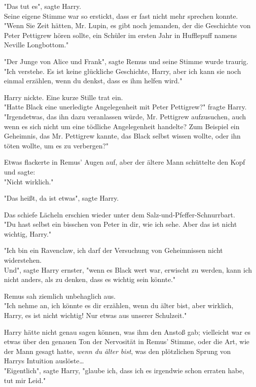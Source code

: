 {"Das tut es", sagte Harry.\\ Seine eigene Stimme war so erstickt, dass er fast nicht mehr sprechen konnte.\\ "Wenn Sie Zeit hätten, Mr. Lupin, es gibt noch jemanden, der die Geschichte von Peter Pettigrew hören sollte, ein Schüler im ersten Jahr in Hufflepuff namens Neville Longbottom."

"Der Junge von Alice und Frank", sagte Remus und seine Stimme wurde traurig.\\ "Ich verstehe. Es ist keine glückliche Geschichte, Harry, aber ich kann sie noch einmal erzählen, wenn du denkst, dass es ihm helfen wird."

Harry nickte. Eine kurze Stille trat ein.\\ "Hatte Black eine unerledigte Angelegenheit mit Peter Pettigrew?" fragte Harry.\\ "Irgendetwas, das ihn dazu veranlassen würde, Mr. Pettigrew aufzusuchen, auch wenn es sich nicht um eine tödliche Angelegenheit handelte? Zum Beispiel ein Geheimnis, das Mr. Pettigrew kannte, das Black selbst wissen wollte, oder ihn töten wollte, um es zu verbergen?"

Etwas flackerte in Remus' Augen auf, aber der ältere Mann schüttelte den Kopf und sagte:\\ "Nicht wirklich."

"Das heißt, da ist etwas", sagte Harry.

Das schiefe Lächeln erschien wieder unter dem Salz-und-Pfeffer-Schnurrbart.\\ "Du hast selbst ein bisschen von Peter in dir, wie ich sehe. Aber das ist nicht wichtig, Harry."

"Ich bin ein Ravenclaw, ich darf der Versuchung von Geheimnissen nicht widerstehen.\\ Und", sagte Harry ernster, "wenn es Black wert war, erwischt zu werden, kann ich nicht anders, als zu denken, dass es wichtig sein könnte."

Remus sah ziemlich unbehaglich aus.\\ "Ich nehme an, ich könnte es dir erzählen, wenn du älter bist, aber wirklich, Harry, es ist nicht wichtig! Nur etwas aus unserer Schulzeit."

Harry hätte nicht genau sagen können, was ihm den Anstoß gab; vielleicht war es etwas über den genauen Ton der Nervosität in Remus' Stimme, oder die Art, wie der Mann gesagt hatte, \emph{wenn du älter bist}, was den plötzlichen Sprung von Harrys Intuition auslöste…\\ "Eigentlich", sagte Harry, "glaube ich, dass ich es irgendwie schon erraten habe, tut mir Leid."

}
